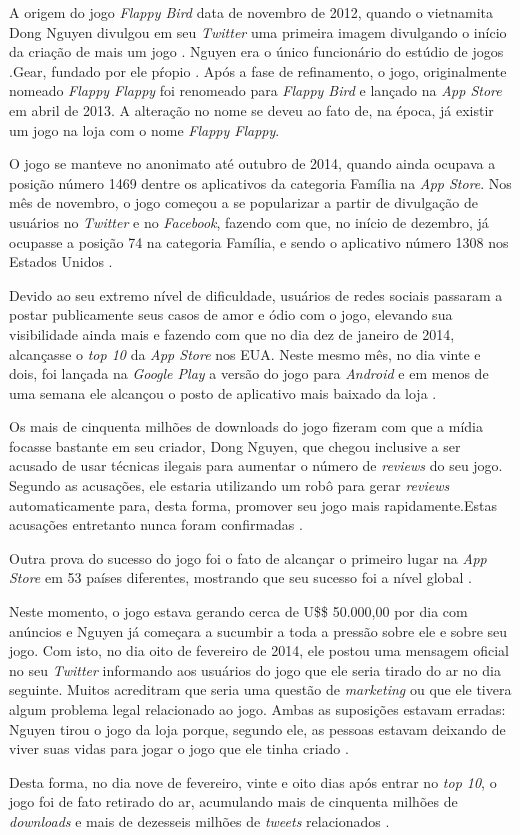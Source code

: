 A origem do jogo \textit{Flappy Bird} data de novembro de 2012, quando o vietnamita Dong Nguyen divulgou em seu \textit{Twitter} uma primeira imagem divulgando o início da criação de mais um jogo \cite{Warren2014}. Nguyen era o único funcionário do estúdio de jogos .Gear, fundado por ele pŕopio \cite{Harvard2014}. Após a fase de refinamento, o jogo, originalmente nomeado \textit{Flappy Flappy} foi renomeado para \textit{Flappy Bird} e lançado na \textit{App Store} em abril de 2013. A alteração no nome se deveu ao fato de, na época, já existir um jogo na loja com o nome \textit{Flappy Flappy}.

O jogo se manteve no anonimato até outubro de 2014, quando ainda ocupava a posição número 1469 dentre os aplicativos da categoria Família na \textit{App Store}. Nos mês de novembro, o jogo começou a se popularizar a partir de divulgação de usuários no \textit{Twitter} e no \textit{Facebook}, fazendo com que, no início de dezembro, já ocupasse a posição 74 na categoria Família, e sendo o aplicativo número 1308 nos Estados Unidos \cite{Warren2014}.

Devido ao seu extremo nível de dificuldade, usuários de redes sociais passaram a postar publicamente seus casos de amor e ódio com o jogo, elevando sua visibilidade ainda mais e fazendo com que no dia dez de janeiro de 2014, alcançasse o \textit{top 10} da \textit{App Store} nos EUA. Neste mesmo mês, no dia vinte e dois, foi lançada na \textit{Google Play} a versão do jogo para \textit{Android} e em menos de uma semana ele alcançou o posto de aplicativo mais baixado da loja \cite{Warren2014}.

Os mais de cinquenta milhões de downloads do jogo fizeram com que a mídia focasse bastante em seu criador, Dong Nguyen, que chegou inclusive a ser acusado de usar técnicas ilegais para aumentar o número de \textit{reviews} do seu jogo. Segundo as acusações, ele estaria utilizando um robô para gerar \textit{reviews} automaticamente para, desta forma, promover seu jogo mais rapidamente.Estas acusações entretanto nunca foram confirmadas \cite{Warren2014}.

Outra prova do sucesso do jogo foi o fato de alcançar o primeiro lugar na \textit{App Store} em 53 países diferentes, mostrando que seu sucesso foi a nível global \cite{Warren2014}.

Neste momento, o jogo estava gerando cerca de U\$\$ 50.000,00 por dia com anúncios e Nguyen já começara a sucumbir a toda a pressão sobre ele e sobre seu jogo. Com isto, no dia oito de fevereiro de 2014, ele postou uma mensagem oficial no seu \textit{Twitter} informando aos usuários do jogo que ele seria tirado do ar no dia seguinte. Muitos acreditram que seria uma questão de \textit{marketing} ou que ele tivera algum problema legal relacionado ao jogo. Ambas as suposições estavam erradas: Nguyen tirou o jogo da loja porque, segundo ele, as pessoas estavam deixando de viver suas vidas para jogar o jogo que ele tinha criado \cite{Warren2014}.

Desta forma, no dia nove de fevereiro, vinte e oito dias após entrar no \textit{top 10}, o jogo foi de fato retirado do ar, acumulando mais de cinquenta milhões de \textit{downloads} e mais de dezesseis milhões de \textit{tweets} relacionados \cite{Warren2014}.